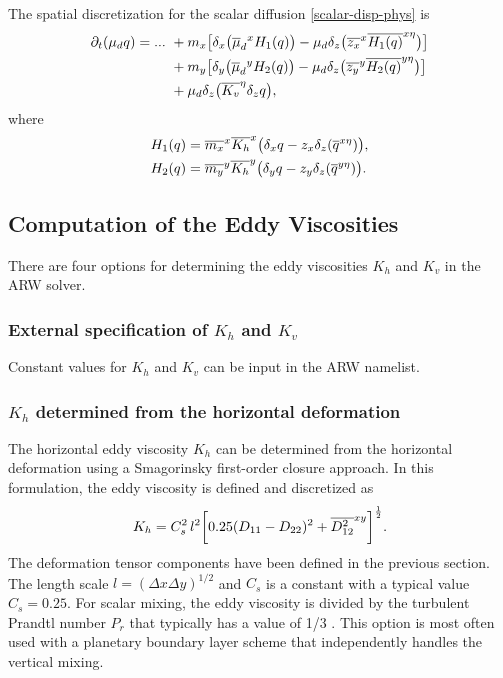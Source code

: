 \noindent
The spatial discretization for the scalar diffusion
\eqref{scalar-disp-phys} is
%
\begin{align}
\partial_t (\mu_d q) = ...\,\, & 
+ m_x \bigl[
\delta_x \bigl({\overline \mu_d}^x H_1( q) \bigr)
- \mu_d \delta_z 
\bigl(\overline{z_x}^x {\overline{H_1( q)}}^{x\eta} \bigr)
\bigr] 
\notag \\
& + m_y \bigl[
\delta_y \bigl({\overline \mu_d}^y H_2( q) \bigr)
- \mu_d \delta_z 
\bigl(\overline{z_y}^y {\overline{H_2( q)}}^{y\eta} \bigr)
\bigr] 
\notag \\
& + \mu_d \delta_z \bigl({\overline{K_v}}^\eta \delta_z  q \bigr),
\notag
\end{align}
%
\noindent
where
\begin{align}
H_1( q) &= \overline{m_x}^x {\overline{K_h}}^x \bigl(
\delta_x q - z_x \delta_z( {\overline{ q}}^{x\eta} )\bigr),
\notag \\
H_2( q) &= \overline{m_y}^y {\overline{K_h}}^y \bigl(
\delta_y q - z_y \delta_z( {\overline{ q}}^{y\eta} )\bigr).
\notag
\end{align}

\subsection{Computation of the Eddy Viscosities}
\label {eddy_section}

There are four options for determining the eddy viscosities $K_h$ and
$K_v$ in the ARW solver.

\subsubsection{External specification of $K_h$ and $K_v$}

Constant values for $K_h$ and $K_v$ can be input in the ARW namelist.

\subsubsection{$K_h$ determined from the horizontal deformation}

The horizontal eddy viscosity $K_h$ can be determined from the
horizontal deformation using a Smagorinsky first-order closure
approach.  In this formulation, the eddy viscosity is defined 
and discretized as
%
\begin{equation}
K_h = C_s^2 \, l^2 \biggl[ 
0.25(D_{11}-D_{22})^2 + {\overline{D_{12}^2}}^{xy}
\biggr]^{1 \over 2}.
\notag
\end{equation}
%
\noindent
The deformation tensor components have been defined in the previous
section.  The length scale $l = (\Delta x \Delta y)^{1/2}$ and $C_s$ is
a constant with a typical value $C_s = 0.25$.  For scalar mixing, the
eddy viscosity is divided by the turbulent Prandtl number $P_r$ that
typically has a value of 1/3 \citep{deardorff72}.  This option is most
often used with a planetary boundary layer scheme that independently
handles the vertical mixing.

